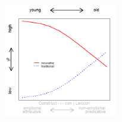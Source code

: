\documentclass[12pt, table]{beamer}
\begin{document}
\begin{frame}
\begin{minipage}[t]{\linewidth}
\begin{minipage}{.45\linewidth}
\end{minipage}
\hfill
\begin{minipage}{.45\linewidth}
\begin{figure}
\includegraphics[width=5cm]{images/LangChang13.png}
\end{figure}
\end{minipage}
\end{minipage}
\end{frame}
\end{document}

